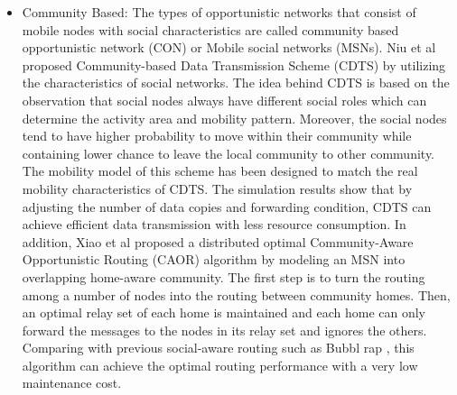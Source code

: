 \begin{itemize}
		\item Community Based:
		The types of opportunistic networks that consist of mobile nodes with social characteristics are called community based opportunistic network (CON) or Mobile social networks (MSNs).
		Niu et al \cite{Jianwei2009} proposed Community-based Data Transmission Scheme (CDTS) by utilizing the characteristics of social networks.
		The idea behind CDTS is based on the observation that social nodes always have different social roles which can determine the activity area and mobility pattern.
		Moreover, the social nodes tend to have higher probability to move within their community while containing lower chance to leave the local community to other community. 
		The mobility model of this scheme has been designed to match the real mobility characteristics of CDTS.
		The simulation results show that by adjusting the number of data copies and forwarding condition, CDTS can achieve efficient data transmission with less resource consumption.
		In addition, Xiao et al \cite{Mingjun2014} proposed a distributed optimal Community-Aware Opportunistic Routing (CAOR) algorithm by modeling an MSN into overlapping home-aware community.
		The first step is to turn the routing among a number of nodes into the routing between community homes.
		Then, an optimal relay set of each home is maintained and each home can only forward the messages to the nodes in its relay set and ignores the others.
		Comparing with previous social-aware routing such as Bubbl rap \cite{pan2011}, this algorithm can achieve the optimal routing performance with a very low maintenance cost.
	\end{itemize}

